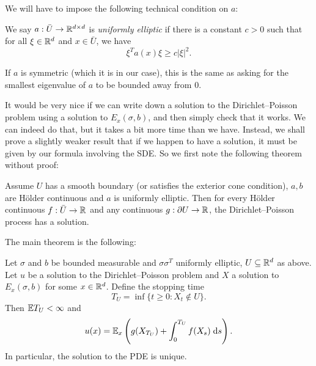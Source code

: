 \documentclass[a4paper]{article}
\begin{document}
We will have to impose the following technical condition on $a$:
\begin{defi}
  We say $a: \bar{U} \to \mathbb{R}^{d \times d}$ is \emph{uniformly elliptic} if there is a constant $c > 0$ such that for all $\xi \in \mathbb{R}^d$ and $x \in \bar{U}$, we have
  \[
    \xi^T a(x) \xi \geq c |\xi|^2.
  \]
\end{defi}
If $a$ is symmetric (which it is in our case), this is the same as asking for the smallest eigenvalue of $a$ to be bounded away from $0$.

It would be very nice if we can write down a solution to the Dirichlet--Poisson problem using a solution to $E_x(\sigma, b)$, and then simply check that it works. We can indeed do that, but it takes a bit more time than we have. Instead, we shall prove a slightly weaker result that if we happen to have a solution, it must be given by our formula involving the SDE. So we first note the following theorem without proof:

\begin{thm}
  Assume $U$ has a smooth boundary (or satisfies the exterior cone condition), $a, b$ are H\"older continuous and $a$ is uniformly elliptic. Then for every H\"older continuous $f: \bar{U} \to \mathbb{R}$ and any continuous $g: \partial U \to \mathbb{R}$, the Dirichlet--Poisson process has a solution.\fakeqed
\end{thm}

The main theorem is the following:
\begin{thm}
  Let $\sigma$ and $b$ be bounded measurable and $\sigma \sigma^T$ uniformly elliptic, $U \subseteq \mathbb{R}^d$ as above. Let $u$ be a solution to the Dirichlet--Poisson problem and $X$ a solution to $E_x(\sigma, b)$ for some $x \in \mathbb{R}^d$. Define the stopping time
  \[
    T_U = \inf \{t \geq 0: X_t \not \in U\}.
  \]
  Then $\mathbb{E} T_U < \infty$ and
  \[
    u(x) = \mathbb{E}_x\left(g(X_{T_U}) + \int_0^{T_U} f(X_s)\;\mathrm{d} s\right).
  \]
  In particular, the solution to the PDE is unique.
\end{thm}
\end{document}
